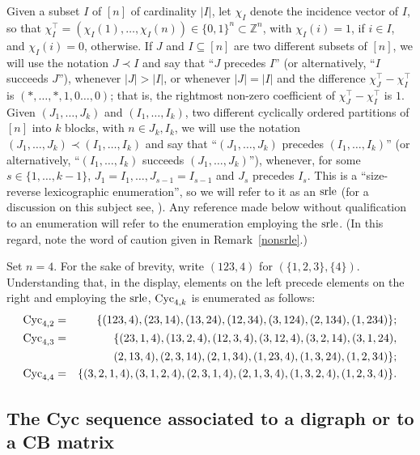 \documentclass[ALCO]{cedram}
\newcommand{\mbz}{\mbox{$\mathbb{Z}$}}
\newcommand{\cyc}{\mbox{${\rm Cyc}$}}
\newcommand{\srle}{\mbox{${\rm srle}$}}
\begin{document}
\begin{remark}\label{srle}
Given a subset $I$ of $[n]$ of cardinality $\lvert I\rvert$, let
$\chi_I$ denote the incidence vector of $I$, so that
$\chi_I^{\top}=(\chi_{I}(1),\ldots ,\chi_{I}(n))\in \{0,1\}^n\subset
\mbz^n$, with $\chi_I(i)=1$, if $i\in I$, and $\chi_I(i)=0$,
otherwise.  If $J$ and $I\subseteq [n]$ are two different subsets of
$[n]$, we will use the notation $J\prec I$ and say that ``$J$ precedes
$I$'' (or alternatively, ``$I$ succeeds $J$''), whenever $\lvert
J\rvert >\lvert I\rvert$, or whenever $\lvert J\rvert=\lvert I\rvert$
and the difference $\chi_J^{\top}-\chi_I^{\top}$ is $(*,\ldots
,*,1,0\ldots ,0)$; that is, the rightmost non-zero coefficient of
$\chi_J^{\top}-\chi_I^{\top}$ is $1$.  Given $(J_1,\ldots ,J_k)$ and
$(I_1,\ldots ,I_k)$, two different cyclically ordered partitions of
$[n]$ into $k$ blocks, with $n\in J_k,I_k$, we will use the notation
$(J_1,\ldots ,J_k)\prec (I_1,\ldots ,I_k)$ and say that ``$(J_1,\ldots
,J_k)$ precedes $(I_1,\ldots ,I_k)$'' (or alternatively,
``$(I_1,\ldots ,I_k)$ succeeds $(J_1,\ldots ,J_k)$''), whenever, for
some $s\in\{1,\ldots ,k-1\}$, $J_1=I_1,\ldots ,J_{s-1}=I_{s-1}$ and
$J_{s}$ precedes $I_s$. This is a ``size-reverse lexicographic
enumeration'', so we will refer to it as an $\srle$ (for a discussion
on this subject see, \eg \cite{lhs}). Any reference made below
without qualification to an enumeration will refer to the enumeration
employing the $\srle$. (In this regard, note the word of caution
given in Remark~\ref{nonsrle}.)
\end{remark}

\begin{example}\label{srlen=4}
Set $n=4$. For the sake of brevity, write $(123,4)$ for
$(\{1,2,3\},\{4\})$.  Understanding that, in the display, elements on
the left precede elements on the right and employing the $\srle$,
$\cyc_{4,k}$ is enumerated as follows:
\begin{eqnarray*}
\cyc_{4,2}&=&\{(123,4),(23,14),(13,24),(12,34),(3,124),(2,134),(1,234)\};\\ 
\cyc_{4,3}&=&\{(23,1,4),(13,2,4),(12,3,4),(3,12,4),(3,2,14),(3,1,24),\\ 
&\mbox{ }&(2,13,4),(2,3,14),(2,1,34),(1,23,4),(1,3,24),(1,2,34)\};\\ 
\cyc_{4,4}&=&\{(3,2,1,4),(3,1,2,4),(2,3,1,4),(2,1,3,4),(1,3,2,4),
(1,2,3,4)\}.
\end{eqnarray*}
\end{example}

\subsection{The Cyc sequence associated to a digraph or to a CB matrix}
\end{document}
